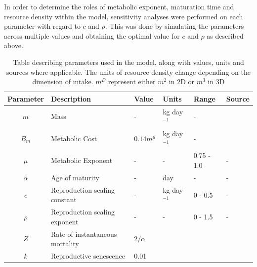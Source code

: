 \documentclass[a4paper, 11pt, hidelinks]{article} %
\begin{document}
	In order to determine the roles of metabolic exponent, maturation time and resource density within the model, sensitivity analyses were performed on each parameter with regard to $c$ and $\rho$.  This was done by simulating the parameters across multiple values and obtaining the optimal value for $c$ and $\rho$ as described above.
	
	
	\begin{centering}
		
		
		\begin{table}[h!]
			
			\caption{Table describing parameters used in the model, along with values, units and sources where applicable.  The units of resource density change depending on the dimension of intake.  $m^D$ represent either $m^2$ in 2D or $m^3$ in 3D} 
			\label{parameters}
			\vspace{2mm}
			\begin{tabular}{c p{3cm} l l l p{3cm}}
				\hline
				Parameter 	& Description 			& Value 	& Units 	& Range 		& Source \\
				\hline
				$m$			& Mass					& -			& kg day$^{-1}$& -			&		\\
				
				$B_m$		& Metabolic Cost		& $0.14 m^{\mu}$ & kg day$^{-1}$& - 	& \cite{Peters1983}\\
				$\mu$		& Metabolic Exponent	& -			&	-		& 0.75 - 1.0	& - \\
				$\alpha$	& Age of maturity		& -     	& day		& -				& -\\
				$c$			& Reproduction scaling constant & - & kg day$^{-1}$& 0 - 0.5 		& -\\
				$\rho$		& Reproduction scaling exponent	& -	&	-		& 0 - 1.5			& -\\
				$Z$			& Rate of instantaneous mortality& $2/\alpha$	& & & \cite{Charnov2001}\\%
				$k$			& Reproductive senescence & 0.01\\
				

\end{tabular}
\end{table}
\end{centering}
\end{document}
